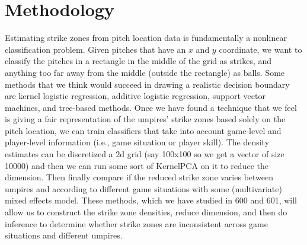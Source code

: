 \documentclass[bj, preprint]{imsart}
\begin{document}
\section{Methodology}\label{sec:method}
Estimating strike zones from pitch location data is fundamentally a nonlinear classification problem. 
Given pitches that have an $x$ and $y$ coordinate, we want to classify the pitches in a rectangle in the middle of the grid as strikes, and anything too far away from the middle (outside the rectangle) as balls.
Some methods that we think would succeed in drawing a realistic decision boundary are kernel logistic regression, additive logistic regression, support vector machines, and tree-based methods. 
Once we have found a technique that we feel is giving a fair representation of the umpires' strike zones based solely on the pitch location, we can train classifiers that take into account game-level and player-level information (i.e., game situation or player skill).
The density estimates can be discretized a 2d grid (say 100x100 so we get a vector of size 10000) and then we can run some sort of KernelPCA on it to reduce the dimension.
Then finally compare if the reduced strike zone varies between umpires and according to different game situations with some 
(multivariate) mixed effects model. 
These methods, which we have studied in 600 and 601, will allow us to construct the strike zone densities, reduce dimension, and then do inference to determine whether strike zones are inconsistent across game situations and different umpires.


{}
\end{document}
